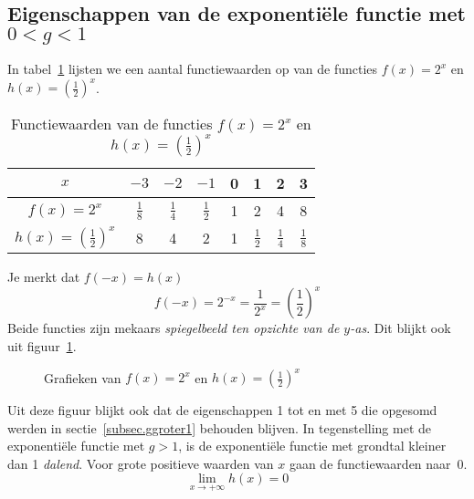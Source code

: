 \subsection[Eigenschappen van de exponenti\"{e}le functie met $g<1$]{Eigenschappen van de exponenti\"{e}le functie met \boldmath$0<g<1$\unboldmath}
In tabel~\ref{tab:expfunckleiner1} lijsten we een aantal functiewaarden op van de functies $f(x)=2^x$ en $h(x)=\left(\frac12\right)^x$.
\begin{table}[htdp]
\caption{Functiewaarden van de functies $f(x)=2^x$ en $h(x)=\left(\frac12\right)^x$}
\centering
\begin{tabular}{c|ccccccc}
$x$&$-3$&$-2$&$-1$&0&1&2&3\\ 
\midrule
$f(x)=2^x$&$\frac18$&$\frac14$&$\frac12$&1&2&4&8\\
$h(x)=\left(\frac12\right)^x$&8&4&2&1&$\frac12$&$\frac14$&$\frac18$
\end{tabular}
\label{tab:expfunckleiner1}
\end{table}%

Je merkt dat $f(-x)=h(x)$ 
\begin{displaymath}
    f(-x)=2^{-x}=\frac{1}{2^{x}} =\left(\frac{1}{2}\right)^{x}
\end{displaymath}
Beide functies zijn mekaars \emph{spiegelbeeld ten opzichte van de $y$-as}. Dit blijkt ook uit figuur~\ref{fig:1/2x}.
\begin{figure}[htbp]
    \centering
    \caption{Grafieken van $f(x)=2^{x}$ en $h(x)={(\frac{1}{2})}^{x}$}
    \label{fig:1/2x}
\end{figure}
Uit deze figuur blijkt ook dat de eigenschappen 1 tot en met 5 die opgesomd werden in sectie~\ref{subsec.ggroter1} behouden blijven. In tegenstelling met de exponenti\"ele functie met $g>1$, is de exponenti\"ele functie met grondtal kleiner dan 1 \emph{dalend}. Voor grote  positieve waarden van $x$ gaan de functiewaarden naar~0.
\[
\lim_{x\rightarrow+\infty}h(x)=0
\]


